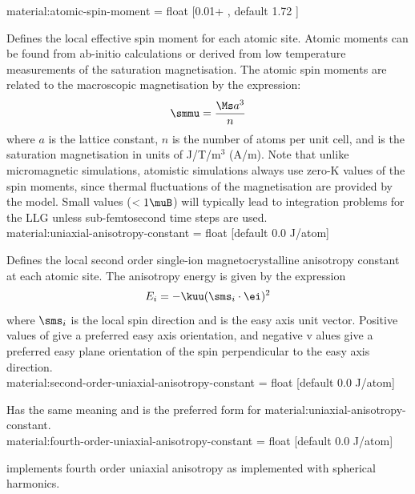 {\zicf material:atomic-spin-moment = float [0.01+ \muB, default 1.72 \muB]}
Defines the local effective spin moment for each atomic site. Atomic moments can be found from ab-initio calculations or derived from low temperature measurements of the saturation magnetisation. The atomic spin moments are related to the macroscopic magnetisation by the expression:
\begin{equation*}
\smmu = \frac{\Ms a^3}{n}
\end{equation*}
where $a$ is the lattice constant, $n$ is the number of atoms per unit cell, and \Ms is the saturation magnetisation in units of J/T/m$^3$ (A/m). Note that unlike micromagnetic simulations, atomistic simulations always use zero-K values of the spin moments, since thermal fluctuations of the magnetisation are provided by the model. Small values ($<1 \muB$) will typically lead to integration problems for the LLG unless sub-femtosecond time steps are used.\\

{\zicf material:uniaxial-anisotropy-constant = float [default 0.0 J/atom]}
  Defines the local second order single-ion magnetocrystalline anisotropy
  constant at each atomic site. The anisotropy energy is given by the expression
\begin{equation*}
E_i = -\kuu (\sms_i \cdot \ei)^2
\end{equation*}
where $\sms_i$ is the local spin direction and \ei is the easy axis unit vector.
Positive values of \kuu give a preferred easy axis orientation, and negative v
alues give a preferred easy plane orientation of the spin perpendicular to the
easy axis direction.\\

{\zicf material:second-order-uniaxial-anisotropy-constant = float [default 0.0 J/atom]}
Has the same meaning and is the preferred form for material:uniaxial-anisotropy-constant.\\

{\zicf material:fourth-order-uniaxial-anisotropy-constant = float [default 0.0 J/atom]}
implements fourth order uniaxial anisotropy as implemented with spherical
harmonics.\\

